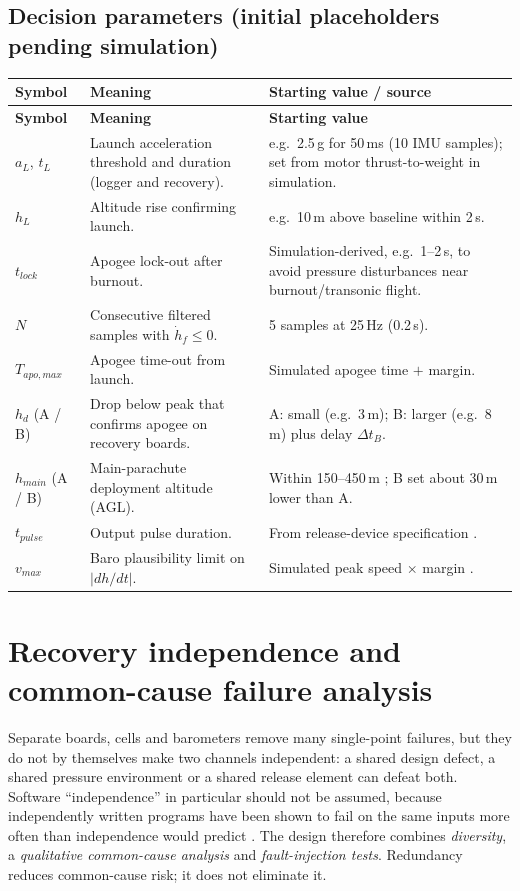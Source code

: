 \subsection{Decision parameters (initial placeholders pending simulation)}
\small
{}
\begin{longtable}{@{}L{22mm}L{58mm}L{66mm}@{}}
\toprule{}\textbf{Symbol}&\textbf{Meaning}&\textbf{Starting value / source}\\\midrule\endfirsthead
\toprule{}\textbf{Symbol}&\textbf{Meaning}&\textbf{Starting value}\\\midrule\endhead
\bottomrule\endlastfoot
$a_L$, $t_L$ & Launch acceleration threshold and duration (logger and recovery). & e.g.\ 2.5\,g for 50\,ms (10 IMU samples); set from motor thrust-to-weight in simulation.\\
$h_L$ & Altitude rise confirming launch. & e.g.\ 10\,m above baseline within 2\,s.\\
$t_{lock}$ & Apogee lock-out after burnout. & Simulation-derived, e.g.\ 1--2\,s, to avoid pressure disturbances near burnout/transonic flight.\\
$N$ & Consecutive filtered samples with $\dot h_f\le0$. & 5 samples at 25\,Hz (0.2\,s).\\
$T_{apo,max}$ & Apogee time-out from launch. & Simulated apogee time $+$ margin.\\
$h_d$ (A / B) & Drop below peak that confirms apogee on recovery boards. & A: small (e.g.\ 3\,m); B: larger (e.g.\ 8\,m) plus delay $\Delta t_B$.\\
$h_{main}$ (A / B) & Main-parachute deployment altitude (AGL). & Within 150--450\,m \cite{rtc2027app03,rtc2027app08}; B set about 30\,m lower than A.\\
$t_{pulse}$ & Output pulse duration. & From release-device specification .\\
$v_{max}$ & Baro plausibility limit on $|dh/dt|$. & Simulated peak speed $\times$ margin .\\
\end{longtable}
\normalsize
\label{tab:params}

\section{Recovery independence and common-cause failure analysis}
\label{sec:ccf}
Separate boards, cells and barometers remove many single-point failures, but they do not by themselves make two channels independent: a shared design defect, a shared pressure environment or a shared release element can defeat both. Software ``independence'' in particular should not be assumed, because independently written programs have been shown to fail on the same inputs more often than independence would predict \cite{knight1986}. The design therefore combines \emph{diversity}, a \emph{qualitative common-cause analysis} and \emph{fault-injection tests}. Redundancy reduces common-cause risk; it does not eliminate it.

